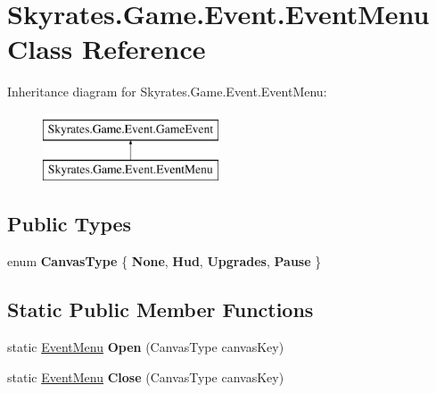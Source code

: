 \hypertarget{class_skyrates_1_1_game_1_1_event_1_1_event_menu}{\section{Skyrates.\-Game.\-Event.\-Event\-Menu Class Reference}
\label{class_skyrates_1_1_game_1_1_event_1_1_event_menu}
}
Inheritance diagram for Skyrates.\-Game.\-Event.\-Event\-Menu\-:\begin{figure}[H]
\begin{center}
\leavevmode
\includegraphics[height=2.000000cm]{class_skyrates_1_1_game_1_1_event_1_1_event_menu}
\end{center}
\end{figure}
\subsection*{Public Types}
\begin{DoxyCompactItemize}
\item 
enum {\bfseries Canvas\-Type} \{ {\bfseries None}, 
{\bfseries Hud}, 
{\bfseries Upgrades}, 
{\bfseries Pause}
 \}
\end{DoxyCompactItemize}
\subsection*{Static Public Member Functions}
\begin{DoxyCompactItemize}
\item 
\hypertarget{class_skyrates_1_1_game_1_1_event_1_1_event_menu_aff37d7870a0c79e971d427b7e7690418}{static \hyperlink{class_skyrates_1_1_game_1_1_event_1_1_event_menu}{Event\-Menu} {\bfseries Open} (Canvas\-Type canvas\-Key)}\label{class_skyrates_1_1_game_1_1_event_1_1_event_menu_aff37d7870a0c79e971d427b7e7690418}

\item 
\hypertarget{class_skyrates_1_1_game_1_1_event_1_1_event_menu_adad383d32d99049bc7756c5c925b5140}{static \hyperlink{class_skyrates_1_1_game_1_1_event_1_1_event_menu}{Event\-Menu} {\bfseries Close} (Canvas\-Type canvas\-Key)}\label{class_skyrates_1_1_game_1_1_event_1_1_event_menu_adad383d32d99049bc7756c5c925b5140}

\end{DoxyCompactItemize}
